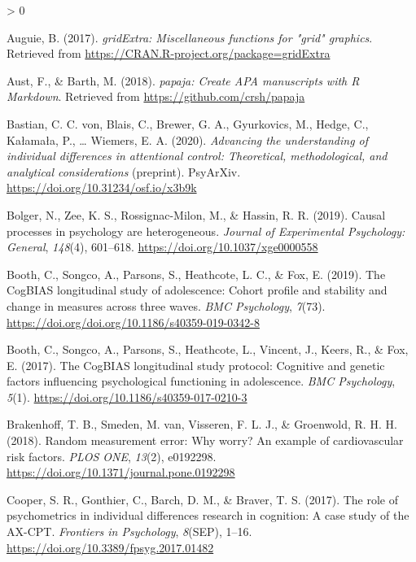 \documentclass[
  english,
  man,floatsintext]{apa6}
\newlength{\cslhangindent}
\newenvironment{CSLReferences}[2] %
 {%
  \setlength{\parindent}{0pt}
  \ifodd #1 \everypar{\setlength{\hangindent}{\cslhangindent}}\ignorespaces\fi
  \ifnum #2 > 0
  \setlength{\parskip}{#2\baselineskip}
  \fi
 }%
 {}
\begin{document}
\hypertarget{refs}{}
\begin{CSLReferences}{1}{0}
\leavevmode\hypertarget{ref-R-gridExtra}{}%
Auguie, B. (2017). \emph{gridExtra: Miscellaneous functions for "grid" graphics}. Retrieved from \url{https://CRAN.R-project.org/package=gridExtra}

\leavevmode\hypertarget{ref-R-papaja}{}%
Aust, F., \& Barth, M. (2018). \emph{{papaja}: {Create} {APA} manuscripts with {R Markdown}}. Retrieved from \url{https://github.com/crsh/papaja}

\leavevmode\hypertarget{ref-von_bastian_advancing_2020}{}%
Bastian, C. C. von, Blais, C., Brewer, G. A., Gyurkovics, M., Hedge, C., Kałamała, P., \ldots{} Wiemers, E. A. (2020). \emph{Advancing the understanding of individual differences in attentional control: {Theoretical}, methodological, and analytical considerations} (preprint). PsyArXiv. \url{https://doi.org/10.31234/osf.io/x3b9k}

\leavevmode\hypertarget{ref-bolger_causal_2019}{}%
Bolger, N., Zee, K. S., Rossignac-Milon, M., \& Hassin, R. R. (2019). Causal processes in psychology are heterogeneous. \emph{Journal of Experimental Psychology: General}, \emph{148}(4), 601--618. \url{https://doi.org/10.1037/xge0000558}

\leavevmode\hypertarget{ref-booth_cogbias_2019}{}%
Booth, C., Songco, A., Parsons, S., Heathcote, L. C., \& Fox, E. (2019). The {CogBIAS} longitudinal study of adolescence: {Cohort} profile and stability and change in measures across three waves. \emph{BMC Psychology}, \emph{7}(73). \url{https://doi.org/doi.org/10.1186/s40359-019-0342-8}

\leavevmode\hypertarget{ref-booth_cogbias_2017}{}%
Booth, C., Songco, A., Parsons, S., Heathcote, L., Vincent, J., Keers, R., \& Fox, E. (2017). The {CogBIAS} longitudinal study protocol: Cognitive and genetic factors influencing psychological functioning in adolescence. \emph{BMC Psychology}, \emph{5}(1). \url{https://doi.org/10.1186/s40359-017-0210-3}

\leavevmode\hypertarget{ref-brakenhoff_random_2018}{}%
Brakenhoff, T. B., Smeden, M. van, Visseren, F. L. J., \& Groenwold, R. H. H. (2018). Random measurement error: {Why} worry? {An} example of cardiovascular risk factors. \emph{PLOS ONE}, \emph{13}(2), e0192298. \url{https://doi.org/10.1371/journal.pone.0192298}

\leavevmode\hypertarget{ref-cooper_role_2017}{}%
Cooper, S. R., Gonthier, C., Barch, D. M., \& Braver, T. S. (2017). The role of psychometrics in individual differences research in cognition: {A} case study of the {AX}-{CPT}. \emph{Frontiers in Psychology}, \emph{8}(SEP), 1--16. \url{https://doi.org/10.3389/fpsyg.2017.01482}


\end{CSLReferences}
\end{document}
